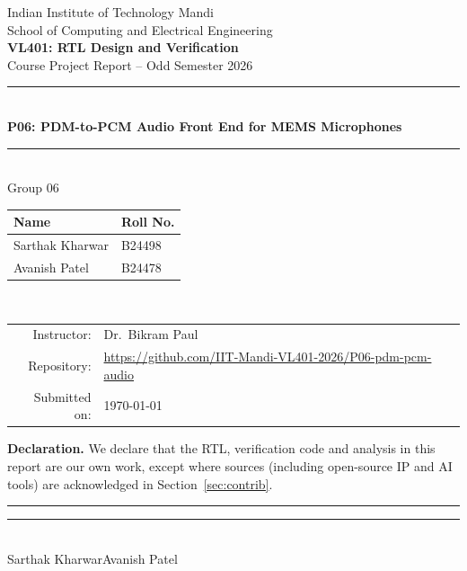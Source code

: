 \documentclass[11pt,a4paper]{article}
\newcommand{\groupno}{06}
\newcommand{\projno}{P06}
\newcommand{\projtitle}{PDM-to-PCM Audio Front End for MEMS Microphones}
\newcommand{\studentA}{Sarthak Kharwar}
\newcommand{\rollA}{B24498}
\newcommand{\studentB}{Avanish Patel}
\newcommand{\rollB}{B24478}
\newcommand{\repourl}{https://github.com/IIT-Mandi-VL401-2026/P06-pdm-pcm-audio}
\newcommand{\submitdate}{\today}
\begin{document}
\begin{titlepage}
\centering
{\large Indian Institute of Technology Mandi}\\[2pt]
{\normalsize School of Computing and Electrical Engineering}\\[1.6cm]
{\Large\bfseries VL401: RTL Design and Verification}\\[4pt]
{\large Course Project Report -- Odd Semester 2026}\\[1.6cm]
{\color{iitblue}\rule{\linewidth}{1pt}}\\[8pt]
{\LARGE\bfseries \projno: \projtitle}\\[8pt]
{\color{iitblue}\rule{\linewidth}{1pt}}\\[1.4cm]
{\large Group \groupno}\\[10pt]
\begin{tabular}{ll}
\toprule
\textbf{Name} & \textbf{Roll No.}\\
\midrule
\studentA & \rollA\\
\studentB & \rollB\\
\bottomrule
\end{tabular}\\[1.2cm]
\begin{tabular}{rl}
Instructor: & Dr.\ Bikram Paul\\
Repository: & \url{\repourl}\\
Submitted on: & \submitdate\\
\end{tabular}
\vfill
\begin{minipage}{0.92\linewidth}\small
\textbf{Declaration.} We declare that the RTL, verification code and analysis in this report are our own
work, except where sources (including open-source IP and AI tools) are acknowledged in
Section~\ref{sec:contrib}.\\[1.0cm]
\rule{5.5cm}{0.4pt}\hfill\rule{5.5cm}{0.4pt}\\
\studentA\hfill\studentB
\end{minipage}
\end{titlepage}
\end{document}
